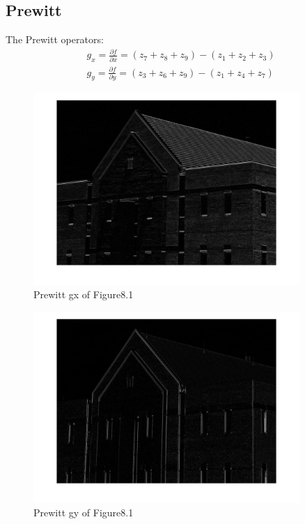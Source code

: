 \documentclass[11pt,oneside]{book}
\begin{document}
\subsection{Prewitt}
The Prewitt operators:
\begin{align}
g_x = \frac{\partial f}{\partial x} = (z_7+z_8+z_9)-(z_1+z_2+z_3)\\
g_y = \frac{\partial f}{\partial y} = (z_3+z_6+z_9)-(z_1+z_4+z_7)
\end{align}
\newpage
\begin{figure}[!htb]
   \centering  
   \includegraphics[width=0.9\textwidth]{images/9/prewitt_x.jpg}
   \caption{Prewitt gx of Figure8.1}
\end{figure}
\begin{figure}[!htb]
   \centering  
   \includegraphics[width=0.9\textwidth]{images/9/prewitt_y.jpg}
   \caption{Prewitt gy of Figure8.1}
\end{figure}
\newpage
\end{document}
